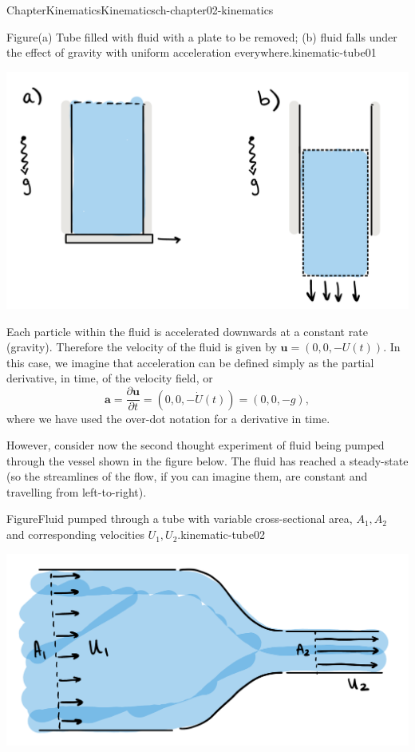 \documentclass[oneside,10pt,]{book}
\numberwithin{equation}{section}
\newcommand{\pd}[2]{\frac{\partial#1}{\partial#2}}
\newcommand{\bu}{\boldsymbol{u}}
\newcommand{\ba}{\boldsymbol{a}}
\begin{document}
\begin{chapterptx}{Chapter}{Kinematics}{}{Kinematics}{}{}{ch-chapter02-kinematics}
\begin{introduction}{}
\begin{figureptx}{Figure}{(a) Tube filled with fluid with a plate to be removed; (b) fluid falls under the effect of gravity with uniform acceleration everywhere.}{kinematic-tube01}{}
\begin{image}{0.1}{0.8}{0.1}{}%
\includegraphics[width=\linewidth]{external/ch-chapter01-kinematics-tube01.png}
\end{image}%
\tcblower
\end{figureptx}%
Each particle within the fluid is accelerated downwards at a constant rate (gravity). Therefore the velocity of the fluid is given by \(\bu = (0, 0, -U(t)).\) In this case, we imagine that acceleration can be defined simply as the partial derivative, in time, of the velocity field, or%
\begin{equation*}
\ba
= \pd{\bu}{t} = (0, 0, -\dot{U}(t)) = (0, 0, -g),
\end{equation*}
where we have used the over-dot notation for a derivative in time.%
\par
However, consider now the second thought experiment of fluid being pumped through the vessel shown in the figure below. The fluid has reached a steady-state (so the streamlines of the flow, if you can imagine them, are constant and travelling from left-to-right).%
\begin{figureptx}{Figure}{Fluid pumped through a tube with variable cross-sectional area, \(A_1, A_2\) and corresponding velocities \(U_1, U_2\).}{kinematic-tube02}{}%
\begin{image}{0.1}{0.8}{0.1}{}%
\includegraphics[width=\linewidth]{external/ch-chapter01-kinematics-tube02.png}

\end{image}
\end{figureptx}
\end{introduction}
\end{chapterptx}
\end{document}
